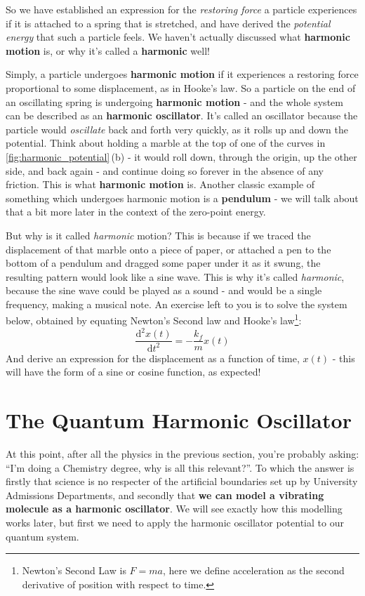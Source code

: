 \documentclass{memoir}[11pt,oneside,a4paper,openany]
\newcommand{\dd}{\ensuremath{\mathrm{d}}}
\begin{document}
So we have established an expression for the \emph{restoring force} a particle experiences if it is attached to a spring that is stretched, and have derived the \emph{potential energy} that such a particle feels. We haven't actually discussed what \textbf{harmonic motion} is, or why it's called a \textbf{harmonic} well!

Simply, a particle undergoes \textbf{harmonic motion} if it experiences a restoring force proportional to some displacement, as in Hooke's law. So a particle on the end of an oscillating spring is undergoing \textbf{harmonic motion} - and the whole system can be described as an \textbf{harmonic oscillator}. It's called an oscillator because the particle would \emph{oscillate} back and forth very quickly, as it rolls up and down the potential. Think about holding a marble at the top of one of the curves in \autoref{fig:harmonic_potential}\,(b) - it would roll down, through the origin, up the other side, and back again - and continue doing so forever in the absence of any friction. This is what \textbf{harmonic motion} is. Another classic example of something which undergoes harmonic motion is a \textbf{pendulum} - we will talk about that a bit more later in the context of the zero-point energy. 

But why is it called \emph{harmonic} motion? This is because if we traced the displacement of that marble onto a piece of paper, or attached a pen to the bottom of a pendulum and dragged some paper under it as it swung, the resulting pattern would look like a sine wave. This is why it's called \emph{harmonic}, because the sine wave could be played as a sound - and would be a single frequency, making a musical note. An exercise left to you is to solve the system below, obtained by equating Newton's Second law and Hooke's law\footnote{Newton's Second Law is $F=ma$, here we define acceleration as the second derivative of position with respect to time.}:
\begin{equation}
	\frac{\dd^2 x(t)}{\dd t^2} = -\frac{k_f}{m}x(t)
\end{equation}
And derive an expression for the displacement as a function of time, $x(t)$ - this will have the form of a sine or cosine function, as expected! 

\section{The Quantum Harmonic Oscillator}
At this point, after all the physics in the previous section, you're probably asking: ``I'm doing a Chemistry degree, why is all this relevant?''. To which the answer is firstly that science is no respecter of the artificial boundaries set up by University Admissions Departments, and secondly that \textbf{we can model a vibrating molecule as a harmonic oscillator}. We will see exactly how this modelling works later, but first we need to apply the harmonic oscillator potential to our quantum system.
\end{document}
